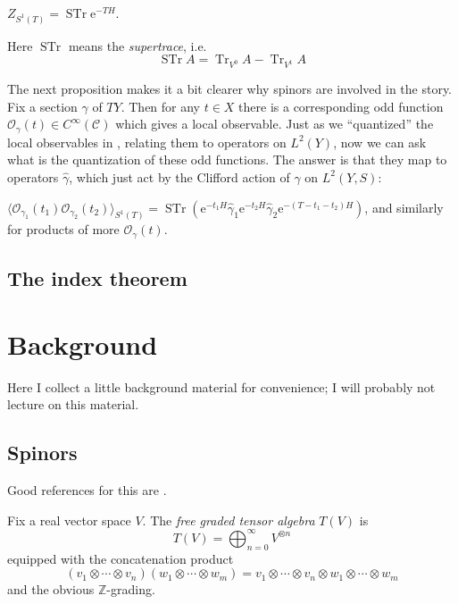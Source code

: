 \documentclass[12pt,letterpaper,reqno]{article}
\numberwithin{equation}{section}
\newcommand{\cC}{\ensuremath{\mathcal C}}
\newcommand{\cO}{\ensuremath{\mathcal O}}
\newcommand{\Z}{\ensuremath{\mathbb Z}}
\newcommand{\e}{{\mathrm e}}
\newcommand{\IP}[1]{\langle#1\rangle}
\newcommand{\ti}[1]{\textit{#1}}
\DeclareMathOperator{\Tr}{Tr}
\DeclareMathOperator{\STr}{STr}
\newcommand{\fixme}[1]{{\color{orange}{[#1]}}}
\begin{document}
\begin{prop} $Z_{S^1(T)} = \STr \e^{-TH}$.
\end{prop}

Here $\STr$ means the \ti{supertrace}, i.e.
\begin{equation}
  \STr A = \Tr_{V^0} A - \Tr_{V^1} A
\end{equation}

\fixme{explain that this is the index}

The next proposition makes it a bit clearer why spinors are
involved in the story. Fix a section $\gamma$ of $TY$. Then
for any $t \in X$ there is a corresponding odd 
function $\cO_\gamma(t) \in C^\infty(\cC)$
which gives a local observable. Just as we ``quantized''
the local observables in \fixme{...}, relating them to
operators on $L^2(Y)$, now we can ask what is the
quantization of these odd functions.
The answer is that they map to operators 
$\hat\gamma$, which just act by the 
Clifford action of $\gamma$ on $L^2(Y, S)$:

\begin{prop} 
$\IP{\cO_{\gamma_1}(t_1) \cO_{\gamma_2}(t_2)}_{S^1(T)} = \STr (\e^{-t_1 H} \hat\gamma_1 \e^{-t_2 H} \hat\gamma_2 \e^{-(T-t_1-t_2)H})$,
and similarly for products of more $\cO_\gamma(t)$.
\end{prop}

\fixme{give a formal discretization calculation}



\subsection{The index theorem}

\fixme{...}


\appendix

\section{Background}

Here I collect a little background material for convenience; I will probably
not lecture on this material.

\subsection{Spinors}

Good references for this are \cite{MR1031992,MR1367507}.

\begin{defn} Fix a real vector space $V$. The
\ti{free graded tensor algebra} $T(V)$ is
\begin{equation}
  T(V) = \bigoplus_{n=0}^\infty V^{\otimes n}
\end{equation}
equipped with the concatenation product
\begin{equation}
  (v_1 \otimes \cdots \otimes v_n) (w_1 \otimes \cdots \otimes w_m) = v_1 \otimes \cdots \otimes v_n \otimes w_1 \otimes \cdots \otimes w_m
\end{equation}
and the obvious $\Z$-grading.
\end{defn}
\end{document}
